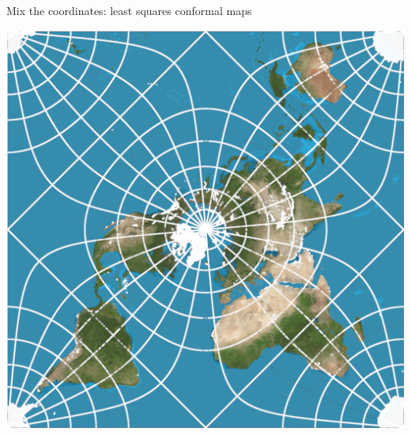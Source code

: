\documentclass[UKenglish,aspectratio=169]{beamer}
\begin{document}
\begin{frame}{Mix the coordinates: least squares conformal maps}
\begin{minipage}{.3\linewidth}
\includegraphics[width=\linewidth]{../manuscript/img/peirce-conformal-map.png}
\end{minipage}
\end{frame}
\end{document}
